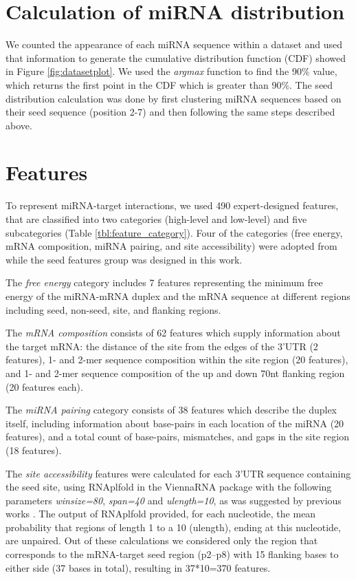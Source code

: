 \section{Calculation of miRNA distribution} \label{miRNAdistribution2}
We counted the appearance of each miRNA sequence within a dataset and used that information to generate the cumulative distribution function (CDF) showed in Figure \ref{fig:datasetplot}. We used the \textit{argmax} function to find the 90\% value, which returns the first point in the CDF which is greater than 90\%. 
The seed distribution calculation was done by first clustering miRNA sequences based on their seed sequence (position 2-7) and then following the same steps described above.

\section{Features} \label{methods_features}
To represent miRNA-target interactions, we used 490 expert-designed features, that are classified into two categories (high-level and low-level) and five subcategories (Table \ref{tbl:feature_category}). Four of the categories (free energy, mRNA composition, miRNA pairing, and site accessibility) were adopted from \cite{wen2018deepmirtar} while the seed features group was designed in this work. 

The \textit{free energy} category includes 7 features representing the minimum free energy of the miRNA-mRNA duplex and the mRNA sequence at different regions including seed, non-seed, site, and flanking regions. 

The \textit{mRNA composition} consists of 62 features which supply information about the target mRNA: the distance of the site from the edges of the 3'UTR (2 features), 1- and 2-mer sequence composition within the site region (20 features), and 1- and 2-mer sequence composition of the up and down 70nt flanking region (20 features each). 

The \textit{miRNA pairing} category consists of 38 features which describe the duplex itself, including information about base-pairs in each location of the miRNA (20 features), and a total count of base-pairs, mismatches, and gaps in the site region (18 features).

The \textit{site accessibility} features were calculated for each 3'UTR sequence containing the seed site, using RNAplfold in the ViennaRNA package \cite{lorenz2011viennarna} with the following parameters \textit{winsize=80}, \textit{span=40} and \textit{ulength=10}, as was suggested by previous works \cite{menor2014mirmark, wen2018deepmirtar}. The output of RNAplfold provided, for each nucleotide, the mean probability that regions of length 1 to a 10 (ulength), ending at this nucleotide, are unpaired. Out of these calculations we considered only the region that corresponds to the mRNA-target seed region (p2–p8) with 15 flanking bases to either side (37 bases in total), resulting in 37*10=370 features.

